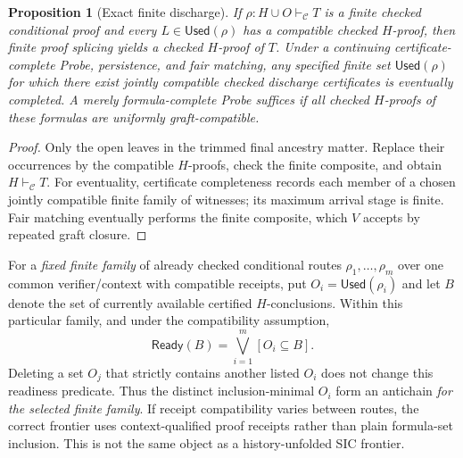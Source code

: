 \documentclass[11pt,letterpaper]{article}
\newtheorem{proposition}[theorem]{Proposition}
\theoremstyle{definition}
\newcommand{\vdC}{\vdash_{\mathcal C}}
\newcommand{\Used}{\mathsf{Used}}
\newcommand{\Ready}{\mathsf{Ready}}
\begin{document}
\begin{proposition}[Exact finite discharge]\label{prop:sets}
If $\rho:H\cup O\vdC T$ is a finite checked conditional proof and
every $L\in\Used(\rho)$ has a compatible checked $H$-proof, then
finite proof splicing yields a checked $H$-proof of $T$.
Under a continuing \emph{certificate-complete} Probe, persistence, and
fair matching, any specified finite set $\Used(\rho)$ for which
there exist \emph{jointly compatible} checked discharge certificates
is eventually completed. A merely formula-complete Probe suffices if
all checked $H$-proofs of these formulas are uniformly graft-compatible.
\end{proposition}
\begin{proof}
Only the open leaves in the trimmed final ancestry matter. Replace
their occurrences by the compatible $H$-proofs, check the finite
composite, and obtain $H\vdC T$. For eventuality, certificate completeness records each member of a
chosen jointly compatible finite family of witnesses; its maximum
arrival stage is finite. Fair matching eventually performs the
finite composite, which $V$ accepts by repeated graft closure.
\end{proof}

For a \emph{fixed finite family} of already checked conditional routes
$\rho_1,\ldots,\rho_m$ over one common verifier/context with compatible
receipts, put $O_i=\Used(\rho_i)$ and let $B$ denote the set of
currently available certified $H$-conclusions. Within this particular
family, and under the compatibility assumption,
\[
 \Ready(B)=\bigvee_{i=1}^m [O_i\subseteq B].
\]
Deleting a set $O_j$ that strictly contains another listed $O_i$
does not change this readiness predicate. Thus the distinct inclusion-minimal
$O_i$ form an antichain \emph{for the selected finite family}. If receipt
compatibility varies between routes, the correct frontier uses
context-qualified proof receipts rather than plain formula-set inclusion.
This is not the same object as a history-unfolded SIC frontier.
\end{document}
